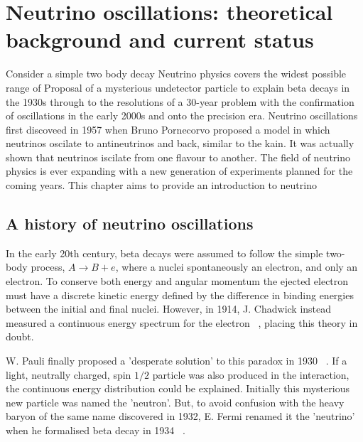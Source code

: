 \chapter{Neutrino oscillations: theoretical background and current status}
\label{chap:theory}

Consider a simple two body decay
Neutrino physics covers the widest possible range of
Proposal of a mysterious undetector particle to explain beta decays in the 1930s through to the resolutions of a 30-year problem with the confirmation of oscillations in the early 2000s and onto the precision era.
Neutrino oscillations first discoveed in 1957 when Bruno Pornecorvo proposed a model in which neutrinos oscilate to antineutrinos and back, similar to the kain. It was actually shown that neutrinos iscilate from one flavour to another.
The field of neutrino physics is ever expanding with a new generation of experiments planned for the coming years.
This chapter aims to provide an introduction to neutrino

\section{A history of neutrino oscillations}
\label{sec:theoryhistory}

\begin{comment}
TODO: Maybe add a few diagrams of the key plots throughout history
\end{comment}

In the early 20th century, beta decays were assumed to follow the simple two-body process, $A \rightarrow B + e$, where a
nuclei spontaneously an electron, and only an electron. To conserve both energy and angular momentum the ejected electron
must have a discrete kinetic energy defined by the difference in binding energies between the initial and final nuclei.
However, in 1914, J. Chadwick instead measured a continuous energy spectrum for the electron ~\cite{chadwick1914},
placing this theory in doubt.

W. Pauli finally proposed a 'desperate solution' to this paradox in 1930 ~\cite{pauli1930}. If a light, neutrally charged,
spin $1/2$ particle was also produced in the interaction, the continuous energy distribution could be explained. Initially
this mysterious new particle was named the 'neutron'. But, to avoid confusion with the heavy baryon of the same name discovered
in 1932, E. Fermi renamed it the 'neutrino' when he formalised beta decay in 1934 ~\cite{fermi1934}.

